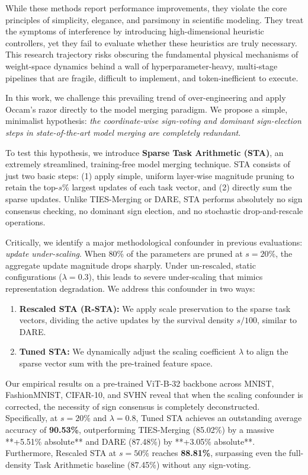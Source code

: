 While these methods report performance improvements, they violate the core principles of simplicity, elegance, and parsimony in scientific modeling. They treat the symptoms of interference by introducing high-dimensional heuristic controllers, yet they fail to evaluate whether these heuristics are truly necessary. This research trajectory risks obscuring the fundamental physical mechanisms of weight-space dynamics behind a wall of hyperparameter-heavy, multi-stage pipelines that are fragile, difficult to implement, and token-inefficient to execute.

In this work, we challenge this prevailing trend of over-engineering and apply Occam's razor directly to the model merging paradigm. We propose a simple, minimalist hypothesis: \textit{the coordinate-wise sign-voting and dominant sign-election steps in state-of-the-art model merging are completely redundant}. 

To test this hypothesis, we introduce \textbf{Sparse Task Arithmetic (STA)}, an extremely streamlined, training-free model merging technique. STA consists of just two basic steps: (1) apply simple, uniform layer-wise magnitude pruning to retain the top-$s$\% largest updates of each task vector, and (2) directly sum the sparse updates. Unlike TIES-Merging or DARE, STA performs absolutely no sign consensus checking, no dominant sign election, and no stochastic drop-and-rescale operations. 

Critically, we identify a major methodological confounder in previous evaluations: \textit{update under-scaling}. When 80\% of the parameters are pruned at $s=20\%$, the aggregate update magnitude drops sharply. Under un-rescaled, static configurations ($\lambda = 0.3$), this leads to severe under-scaling that mimics representation degradation. We address this confounder in two ways:
\begin{enumerate}
    \item \textbf{Rescaled STA (R-STA):} We apply scale preservation to the sparse task vectors, dividing the active updates by the survival density $s/100$, similar to DARE.
    \item \textbf{Tuned STA:} We dynamically adjust the scaling coefficient $\lambda$ to align the sparse vector sum with the pre-trained feature space.
\end{enumerate}

Our empirical results on a pre-trained ViT-B-32 backbone across MNIST, FashionMNIST, CIFAR-10, and SVHN reveal that when the scaling confounder is corrected, the necessity of sign consensus is completely deconstructed. Specifically, at $s=20\%$ and $\lambda=0.8$, Tuned STA achieves an outstanding average accuracy of \textbf{90.53\%}, outperforming TIES-Merging (85.02\%) by a massive **+5.51\% absolute** and DARE (87.48\%) by **+3.05\% absolute**. Furthermore, Rescaled STA at $s=50\%$ reaches \textbf{88.81\%}, surpassing even the full-density Task Arithmetic baseline (87.45\%) without any sign-voting.

